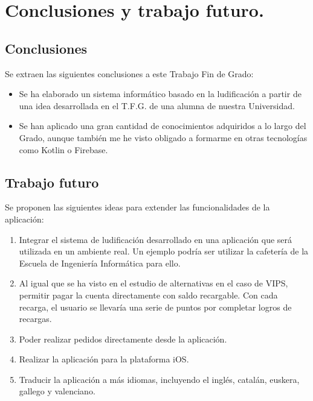 \documentclass[twoside]{report}
\begin{document}
\chapter{Conclusiones y trabajo futuro.}
\section{Conclusiones}

Se extraen las siguientes conclusiones a este Trabajo Fin de Grado:
\begin{itemize}

\item Se ha elaborado un sistema informático basado en la ludificación a partir de una idea desarrollada en el T.F.G. de una alumna de nuestra Universidad.

\item Se han aplicado una gran cantidad de conocimientos adquiridos a lo largo del Grado, aunque también me he visto obligado a formarme en otras tecnologías como Kotlin o Firebase.
\end{itemize}

\section{Trabajo futuro}

Se proponen las siguientes ideas para extender las funcionalidades de la aplicación:

\begin{enumerate}
\item Integrar el sistema de ludificación desarrollado en una aplicación que será utilizada en un ambiente real. Un ejemplo podría ser utilizar la cafetería de la Escuela de Ingeniería Informática para ello.

\item Al igual que se ha visto en el estudio de alternativas en el caso de VIPS, permitir pagar la cuenta directamente con saldo recargable. Con cada recarga, el usuario se llevaría una serie de puntos por completar logros de recargas.

\item Poder realizar pedidos directamente desde la aplicación.

\item Realizar la aplicación para la plataforma iOS.

\item Traducir la aplicación a más idiomas, incluyendo el inglés, catalán, euskera, gallego y valenciano.
\end{enumerate}
\end{document}
